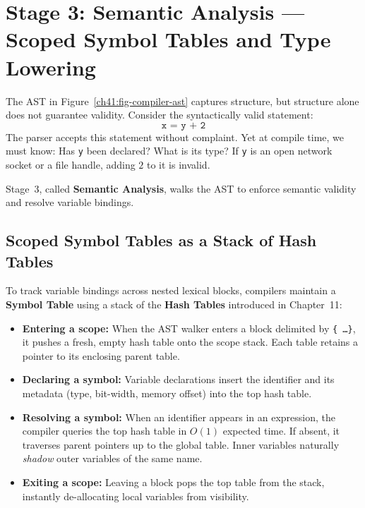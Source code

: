 \section{Stage 3: Semantic Analysis --- Scoped Symbol Tables and Type Lowering}
\label{ch41:semantics}

The AST in Figure~\ref{ch41:fig-compiler-ast} captures structure, but structure
alone does not guarantee validity. Consider the syntactically valid statement:
\[
  \texttt{x = y + 2}
\]
The parser accepts this statement without complaint. Yet at compile time, we must
know: Has \texttt{y} been declared? What is its type? If \texttt{y} is an open
network socket or a file handle, adding $2$ to it is invalid.

Stage~3, called \textbf{Semantic Analysis}, walks the AST to enforce semantic
validity and resolve variable bindings.

\subsection{Scoped Symbol Tables as a Stack of Hash Tables}

To track variable bindings across nested lexical blocks, compilers maintain a
\textbf{Symbol Table} using a stack of the \textbf{Hash Tables} introduced in
Chapter~11:
\begin{itemize}
  \item \textbf{Entering a scope:} When the AST walker enters a block delimited
  by \texttt{\{ \dots \}}, it pushes a fresh, empty hash table onto the scope stack.
  Each table retains a pointer to its enclosing parent table.
  \item \textbf{Declaring a symbol:} Variable declarations insert the identifier
  and its metadata (type, bit-width, memory offset) into the top hash table.
  \item \textbf{Resolving a symbol:} When an identifier appears in an expression,
  the compiler queries the top hash table in $O(1)$ expected time. If absent, it
  traverses parent pointers up to the global table. Inner variables naturally
  \emph{shadow} outer variables of the same name.
  \item \textbf{Exiting a scope:} Leaving a block pops the top table from the stack,
  instantly de-allocating local variables from visibility.
\end{itemize}

